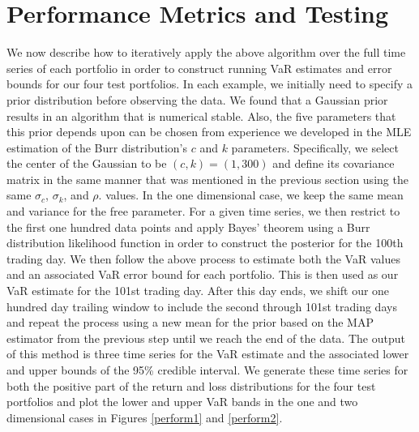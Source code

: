 \documentclass{amsart}
\begin{document}
\section{Performance Metrics and Testing}

We now describe how to iteratively apply the above algorithm over the full time 
series of each portfolio in order to construct running VaR estimates and error bounds 
for our four test portfolios.  In 
each example, we initially need to specify a prior distribution before observing the data. 
We found that a Gaussian prior results in an algorithm that is numerical stable. 
Also, the five parameters that this prior depends upon can be chosen from experience we developed in 
the MLE estimation of the Burr distribution's $c$ and $k$ parameters.  Specifically, we select the center 
of the Gaussian to be $(c,k)=(1,300)$ and define its covariance matrix in the same manner that 
was mentioned in the previous section using the same $\sigma_c$, $\sigma_k$, and $\rho$. 
values. In the one dimensional case, we keep the same mean and variance for the 
free parameter. For a given time series, we then restrict to the first one hundred 
data points and apply Bayes' theorem using a Burr distribution likelihood function 
in order to construct the posterior for the 100th trading day.  We then follow the above 
process to estimate both the VaR values and an associated VaR error bound for each portfolio.  
This is then used as our VaR estimate for the 101st trading day.  After this day ends, 
we shift our one hundred day trailing window to include the second through 101st trading 
days and repeat the process using a new mean for the prior based on the MAP estimator from the 
previous step until we reach the end of the data. The output of this method 
is three time series for the VaR estimate and the associated lower and upper bounds of the 
95\% credible interval.  We generate these time series for both the positive part of
the return and loss distributions for the four test portfolios and 
plot the lower and upper VaR bands in the one and two dimensional cases in 
Figures \ref{perform1} and \ref{perform2}.  
\end{document}
